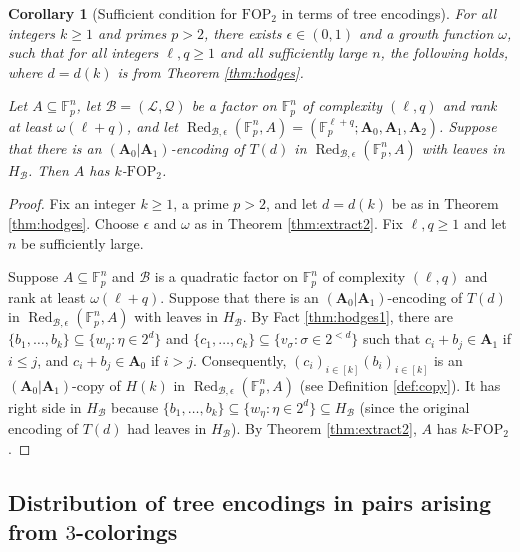 \documentclass[12pt,oneside,british,a4wide]{amsart}
\newtheorem{corollary}[theorem]{Corollary}
\numberwithin{equation}{section}
\theoremstyle{definition}
\def\F{\mathbb{F}}
\def\FOP{\mathrm{FOP}}
\def\e{\epsilon}
\newcommand{\calL}{\mathcal{L}}
\newcommand{\calB}{\mathcal{B}}
\newcommand{\calQ}{\mathcal{Q}}
\newcommand{\Red}{{\mathrm{Red}}}
\def\Red{\operatorname{Red}}
\begin{document}
\begin{corollary}[Sufficient condition for $\FOP_2$ in terms of tree encodings]\label{cor:extract2}
For all integers $k\geq 1$ and primes $p>2$, there exists  $\e\in (0,1)$ and a growth function $\omega$, such that for all integers $\ell, q\geq 1$ and all sufficiently large $n$, the following holds, where $d=d(k)$ is from Theorem \ref{thm:hodges}.

Let $A\subseteq \mathbb{F}_p^n$,  let $\calB=(\calL,\calQ)$ be a factor on $\F_p^n$ of complexity $(\ell,q)$ and rank at least $\omega(\ell+q)$, and let $\Red_{\calB,\e}(\F_p^n,A)=(\F_p^{\ell+q}; \mathbf{A}_0,\mathbf{A}_1,\mathbf{A}_2)$.  Suppose that there is an $(\mathbf{A}_0|\mathbf{A}_1)$-encoding of $T(d)$ in $\Red_{\calB,\e}(\F_p^n,A)$ with leaves in $H_{\calB}$. Then $A$ has $k$-$\FOP_2$.


\end{corollary}
\begin{proof}
Fix an integer $k\geq 1$, a prime $p>2$, and let $d=d(k)$ be as in Theorem \ref{thm:hodges}. Choose $\e$ and $\omega$ as in Theorem \ref{thm:extract2}.  Fix $\ell,q\geq 1$ and let $n$ be sufficiently large.  

Suppose $A\subseteq \F_p^n$  and $\calB$ is a quadratic factor on $\F_p^n$ of complexity $(\ell,q)$ and rank at least $\omega(\ell+q)$.  Suppose that there is an $(\mathbf{A}_0|\mathbf{A}_1)$-encoding of $T(d)$ in $\Red_{\calB,\e}(\F_p^n,A)$ with leaves in $H_{\calB}$.  By Fact \ref{thm:hodges1}, there are $\{b_1,\ldots, b_k\}\subseteq \{w_{\eta}: \eta\in 2^d\}$ and $\{c_1,\ldots, c_k\}\subseteq \{v_{\sigma}:\sigma\in 2^{<d}\}$ such that $c_i+b_j\in \mathbf{A}_1$ if $i\leq j$, and $c_i+b_j\in \mathbf{A}_0$ if $i>j$. Consequently, $(c_i)_{i\in [k]}(b_i)_{i\in [k]}$ is an $(\mathbf{A}_0|\mathbf{A}_1)$-copy of $H(k)$ in $\Red_{\calB,\e}(\F_p^n,A)$ (see Definition \ref{def:copy}).  It has right side in $H_{\calB}$ because $\{b_1,\ldots, b_k\}\subseteq \{w_{\eta}: \eta\in 2^d\}\subseteq H_{\calB}$ (since the original encoding of $T(d)$ had leaves in $H_{\calB}$). By Theorem \ref{thm:extract2}, $A$ has $k$-$\FOP_2$.
\end{proof}


\subsection{Distribution of tree encodings in pairs arising from $3$-colorings}
\end{document}
